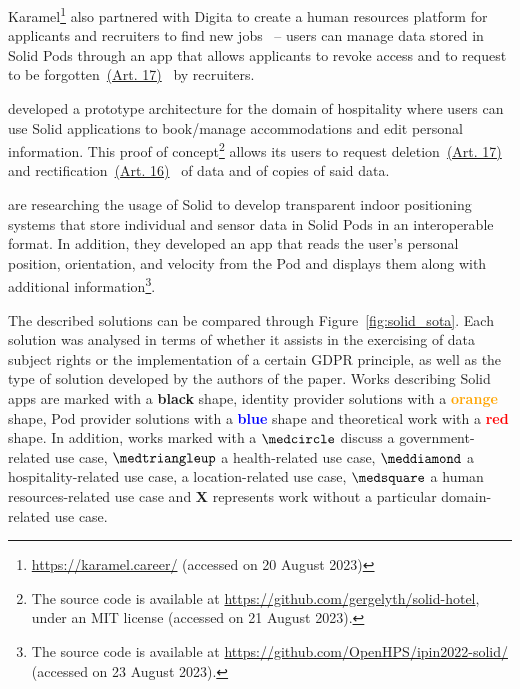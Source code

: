 Karamel\footnote{\url{https://karamel.career/} (accessed on 20 August 2023)} also partnered with Digita to create a human resources platform for applicants and recruiters to find new jobs~\citep{verstraete_solid_2022} -- users can manage data stored in Solid Pods through an app that allows applicants to revoke access and to request to be forgotten~\hyperref[art:17]{(Art. 17)}~\citeyearpar{noauthor_regulation_2016} by recruiters.

\cite{toth_preserving_2022} developed a prototype architecture for the domain of hospitality where users can use Solid applications to book/manage accommodations and edit personal information. This proof of concept\footnote{The source code is available at \url{https://github.com/gergelyth/solid-hotel}, under an MIT license (accessed on 21 August 2023).} allows its users to request deletion~\hyperref[art:17]{(Art. 17)}~\citeyearpar{noauthor_regulation_2016} and rectification~\hyperref[art:16]{(Art. 16)}~\citeyearpar{noauthor_regulation_2016} of data and of copies of said data.

\cite{van_de_wynckel_solidbased_2022} are researching the usage of Solid to develop transparent indoor positioning systems that store individual and sensor data in Solid Pods in an interoperable format. In addition, they developed an app that reads the user’s personal position, orientation, and velocity from the Pod and displays them along with additional information\footnote{The source code is available at \url{https://github.com/OpenHPS/ipin2022-solid/} (accessed on 23 August 2023).}.

The described solutions can be compared through Figure~\ref{fig:solid_sota}.
Each solution was analysed in terms of whether it assists in the exercising of data subject rights or the implementation of a certain GDPR principle, as well as the type of solution developed by the authors of the paper.
Works describing Solid apps are marked with a \textbf{black} shape, identity provider solutions with a \textbf{\textcolor{orange}{orange}} shape, Pod provider solutions with a \textbf{\textcolor{blue}{blue}} shape and theoretical work with a \textbf{\textcolor{red}{red}} shape.
In addition, works marked with a $\medcircle$ discuss a government-related use case, $\medtriangleup$ a health-related use case, $\meddiamond$ a hospitality-related use case, \faStarO\space a location-related use case, $\medsquare$ a human resources-related use case and \textbf{X} represents work without a particular domain-related use case.

